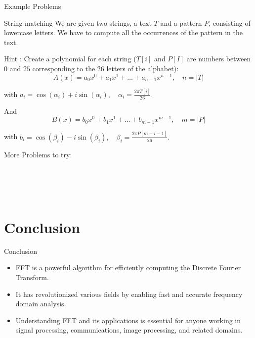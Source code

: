 \documentclass{beamer}
\begin{document}
    \begin{frame}{Example Problems}
        \begin{block}{String matching}
           We are given two strings, a text $T$ and a pattern $P$, consisting of lowercase letters. We have to compute all the occurrences of the pattern in the text. \end{block}
\begin{block}{Hint : }
Create a polynomial for each string ($T[i]$ and $P[I]$ are numbers between $0$ and $25$ corresponding to the $26$ letters of the alphabet):
$$A(x) = a_0 x^0 + a_1 x^1 + \dots + a_{n-1} x^{n-1}, \quad n = |T|$$

with
$a_i = \cos(\alpha_i) + i \sin(\alpha_i), \quad \alpha_i = \frac{2 \pi T[i]}{26}.$

And
$$B(x) = b_0 x^0 + b_1 x^1 + \dots + b_{m-1} x^{m-1}, \quad m = |P|$$

with
$b_i = \cos(\beta_i) - i \sin(\beta_i), \quad \beta_i = \frac{2 \pi P[m-i-1]}{26}.$
        \end{block}
    \end{frame}
    \begin{frame}{More Problems to try:}
        \href{https://www.spoj.com/problems/POLYMUL/}{\color{blue}{POLYMUL - Polynomial Multiplication}}
\vspace{0.5cm}\\
\href{https://www.spoj.com/problems/MAXMATCH/}{\color{blue}{MAXMATCH - Maximum Self-Matching}}
\vspace{0.5cm}\\
\href{https://www.spoj.com/problems/ADAMATCH/}{\color{blue}{ADAMATCH - Ada and Nucleobase}}
\vspace{0.5cm}\\
\href{https://codeforces.com/problemset/problem/954/I}{\color{blue}{Yet Another String Matching Problem}}
\vspace{0.5cm}\\
\href{https://codeforces.com/problemset/problem/958/F3}{\color{blue}{Lightsabers (hard)}}
\vspace{0.5cm}\\
\href{https://codeforces.com/contest/1398/problem/G}{\color{blue}{Running Competition}}
    \end{frame}



\section{Conclusion}
\begin{frame}{Conclusion}
  \begin{itemize}
    \item FFT is a powerful algorithm for efficiently computing the Discrete Fourier Transform.
    \item It has revolutionized various fields by enabling fast and accurate frequency domain analysis.
    \item Understanding FFT and its applications is essential for anyone working in signal processing, communications, image processing, and related domains.
  \end{itemize}
\end{frame}
\end{document}
